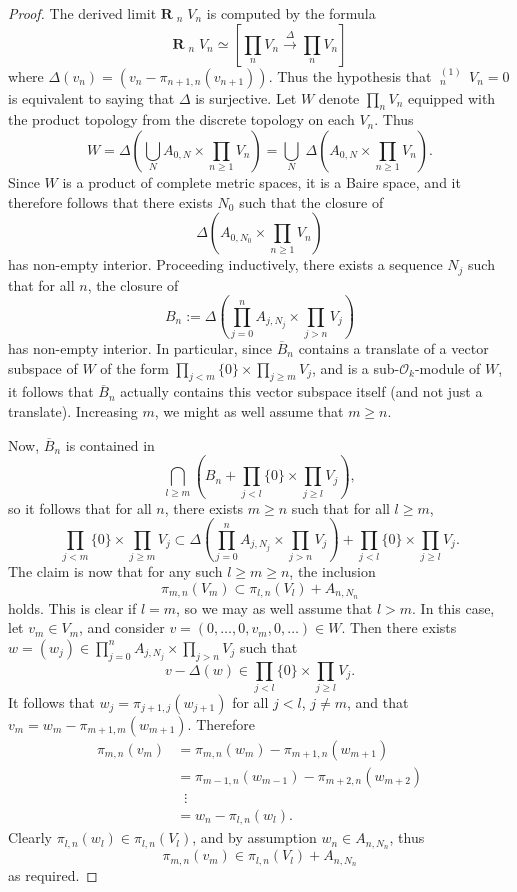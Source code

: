 \documentclass[11pt,leqno,a4paper]{amsart}
\theoremstyle{remark}
\theoremstyle{definition}
\numberwithin{equation}{theorem}
\def\cO{{\mathcal O}}
\def\limpro{\mathop{\lim\limits_{\displaystyle\leftarrow}}}
\begin{document}
\begin{proof} The derived limit $\mathbf{R}\!\limpro_{n} V_n$ is computed by the formula
\[ \mathbf{R}\!\limpro_{n} V_n \simeq \left[ \prod_n V_n \overset{\Delta}{\longrightarrow} \prod_n V_n \right] \]
where $\Delta(v_n)=(v_n-\pi_{n+1,n}(v_{n+1}))$. Thus the hypothesis that $\limpro_{n}^{(1)}\,V_n=0$ is equivalent to saying that $\Delta$ is surjective. Let $W$ denote $\prod_n V_n$ equipped with the product topology from the discrete topology on each $V_n$. Thus
\[ W = \Delta\left (\bigcup_N A_{0,N} \times \prod_{n\geq 1} V_n \right)=\bigcup_N \;\Delta\left(A_{0,N}\times \prod_{n\geq 1} V_n \right).\]
Since $W$ is a product of complete metric spaces, it is a Baire space, and it therefore follows that there exists $N_0$ such that the closure of 
\[ \Delta\left(A_{0,N_0}\times \prod_{n\geq 1} V_n\right) \]
has non-empty interior. Proceeding inductively, there exists a sequence $N_j$ such that for all $n$, the closure of 
\[ B_n:=\Delta\left(\prod_{j=0}^n A_{j,N_j}\times \prod_{j> n} V_j\right) \]
has non-empty interior. In particular, since $\overline{B}_n$ contains a translate of a vector subspace of $W$ of the form $\prod_{j<m} \{0\}\times \prod_{j\geq m} V_j$, and is a sub-$\cO_k$-module of $W$, it follows that $\overline{B}_n$ actually contains this vector subspace itself (and not just a translate). Increasing $m$, we might as well assume that $m\geq n$.

Now, $\overline{B}_n$ is contained in
\[  \bigcap_{l\geq m} \left( B_n + \prod_{j<l} \{0\} \times \prod_{j\geq l} V_j\right), \]
so it follows that for all $n$, there exists $m\geq n$ such that for all $l\geq m$, 
\[\prod_{j<m} \{0\}\times \prod_{j\geq m} V_j \subset \Delta\left(\prod_{j=0}^n A_{j,N_j}\times \prod_{j> n} V_j\right) +   \prod_{j<l} \{0\} \times \prod_{j\geq l} V_j.  \]
The claim is now that for any such $l \geq m\geq n$, the inclusion
\[  \pi_{m,n}(V_m)\subset \pi_{l,n}(V_l)+A_{n,N_n} \]
holds. This is clear if $l=m$, so we may as well assume that $l>m$. In this case, let $v_m\in V_m$, and consider $v=(0,\ldots,0,v_m,0,\ldots)\in W$. Then there exists $w=(w_j) \in \prod_{j=0}^n A_{j,N_j}\times \prod_{j> n} V_j$ such that
\[ v-\Delta(w) \in \prod_{j<l} \{0\} \times \prod_{j\geq l} V_j.\]
It follows that $w_j=\pi_{j+1,j}(w_{j+1})$ for all $j<l$, $j\neq m$, and that $v_m=w_m-\pi_{m+1,m}(w_{m+1})$. Therefore
\begin{align*} \pi_{m,n}(v_m) &=  \pi_{m,n}(w_m)-\pi_{m+1,n}(w_{m+1}) \\
&= \pi_{m-1,n}(w_{m-1})-\pi_{m+2,n}(w_{m+2}) \\
& \;\;\vdots \\
&= w_n - \pi_{l,n}(w_l).
\end{align*}
Clearly $\pi_{l,n}(w_l)\in \pi_{l,n}(V_{l})$, and by assumption $w_n\in A_{n,N_n}$, thus
\[ \pi_{m,n}(v_m) \in \pi_{l,n}(V_l)+A_{n,N_n} \]
as required.
\end{proof}
\end{document}
